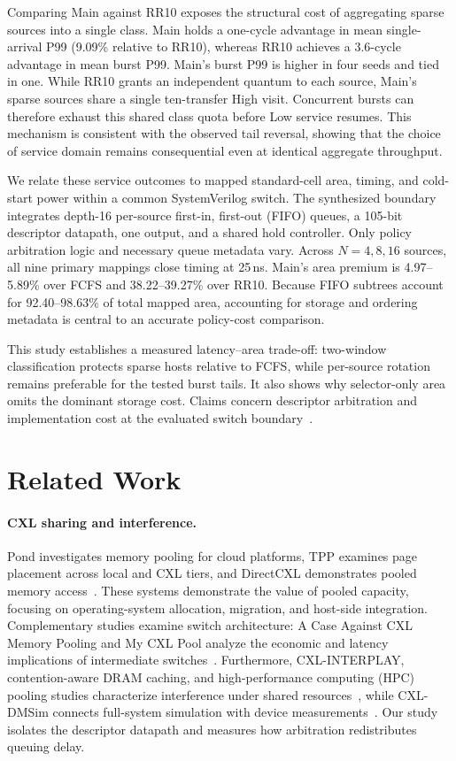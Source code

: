 Comparing Main against RR10 exposes the structural cost of aggregating sparse
sources into a single class. Main holds a one-cycle advantage in mean
single-arrival P99 (9.09\% relative to RR10), whereas RR10 achieves a 3.6-cycle
advantage in mean burst P99. Main's burst P99 is higher in four seeds and tied in
one. While RR10 grants an independent quantum to each source, Main's sparse
sources share a single ten-transfer High visit. Concurrent bursts can therefore
exhaust this shared class quota before Low service resumes. This mechanism is
consistent with the observed tail reversal, showing that the choice of service
domain remains consequential even at identical aggregate throughput.

We relate these service outcomes to mapped standard-cell area, timing, and
cold-start power within a common SystemVerilog switch. The synthesized boundary
integrates depth-16 per-source first-in, first-out (FIFO) queues, a 105-bit
descriptor datapath, one output, and a shared hold controller. Only policy
arbitration logic and necessary queue metadata vary. Across $N=4,8,16$ sources,
all nine primary mappings close timing at 25\,ns. Main's area premium is
4.97--5.89\% over FCFS and 38.22--39.27\% over RR10. Because FIFO subtrees
account for 92.40--98.63\% of total mapped area, accounting for storage and
ordering metadata is central to an accurate policy-cost comparison.

This study establishes a measured latency--area trade-off: two-window
classification protects sparse hosts relative to FCFS, while per-source
rotation remains preferable for the tested burst tails. It also shows why
selector-only area omits the dominant storage cost. Claims concern descriptor
arbitration and implementation cost at the evaluated switch boundary~\cite{artifact}.

\section{Related Work}
\paragraph{CXL sharing and interference.}
Pond investigates memory pooling for cloud platforms, TPP examines page placement
across local and CXL tiers, and DirectCXL demonstrates pooled memory
access~\cite{pond,tpp,directcxl}. These systems demonstrate the value of pooled
capacity, focusing on operating-system allocation, migration, and host-side
integration. Complementary studies examine switch architecture: A Case Against
CXL Memory Pooling and My CXL Pool analyze the economic and latency implications
of intermediate switches~\cite{case_pool,my_cxl_pool}. Furthermore,
CXL-INTERPLAY, contention-aware DRAM caching, and high-performance computing
(HPC) pooling studies characterize interference under shared
resources~\cite{cxl_interplay,contention_cache,hpc_pool}, while CXL-DMSim
connects full-system simulation with device measurements~\cite{cxldmsim}.
Our study isolates the descriptor datapath and measures how arbitration redistributes queuing delay.

